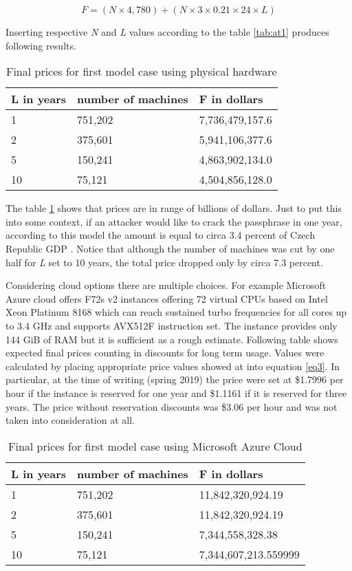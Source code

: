 \documentclass[nolof]{fithesis3}
\begin{document}
$$F = ( N \times 4,780 ) + ( N \times 3 \times 0.21 \times 24 \times L)$$

Inserting respective \emph{N} and \emph{L} values according to the table \ref{tab:at1} produces following results.

\noindent
\begin{table}
\caption{Final prices for first model case using physical hardware}
\label{tab:at2}
\begin{tabularx}{\textwidth}{| X | X | X |}
\hline
L  in years & number of machines & F in dollars\\
\hline
1 & 751,202 & 7,736,479,157.6\\
\hline
2 & 375,601 & 5,941,106,377.6\\
\hline
5 & 150,241 & 4,863,902,134.0\\
\hline
10 & 75,121 & 4,504,856,128.0\\
\hline
\end{tabularx}
\end{table}

The table \ref{tab:at2} shows that prices are in range of billions of dollars. Just to put this into some context, if an attacker would like to crack the passphrase in one year, according to this model the amount is equal to circa 3.4 percent of Czech Republic GDP \parencite{czechgdp}. Notice that although the number of machines was cut by one half for \emph{L} set to 10 years, the total price dropped only by circa 7.3 percent.

Considering cloud options there are multiple choices. For example Microsoft Azure cloud offers F72s v2 instances offering 72 virtual CPUs based on Intel Xeon Platinum 8168 which can reach sustained turbo frequencies for all cores up to 3.4 GHz and supports AVX512F instruction set. The instance provides only 144 GiB of RAM but it is sufficient as a rough estimate. Following table shows expected final prices counting in discounts for long term usage. Values were calculated by placing appropriate price values showed at \parencite{azure} into equation \ref{eq3}. In particular, at the time of writing (spring 2019) the price were set at \$1.7996 per hour if the instance is reserved for one year and \$1.1161 if it is reserved for three years. The price without reservation discounts was \$3.06 per hour and was not taken into consideration at all.

\noindent
\begin{table}
\caption{Final prices for first model case using Microsoft Azure Cloud}
\label{tab:at3}
\begin{tabularx}{\textwidth}{| X | X | X |}
\hline
L  in years & number of machines & F in dollars\\
\hline
1 & 751,202 & 11,842,320,924.19\\
\hline
2 & 375,601 & 11,842,320,924.19\\
\hline
5 & 150,241 & 7,344,558,328.38\\
\hline
10 & 75,121 & 7,344,607,213.559999\\
\hline
\end{tabularx}
\end{table}
\end{document}
